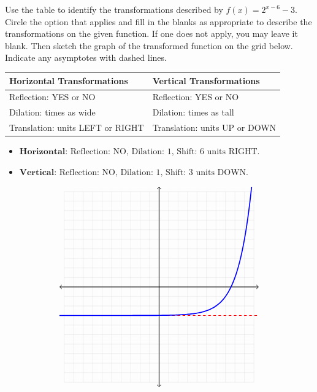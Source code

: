 \documentclass[addpoints]{exam}
\begin{document}
\begin{questions}
\begin{center}
\end{center}
\newpage

\question[5] Use the table to identify the transformations described by \(\displaystyle{ f(x) = 2^{x - 6} - 3 }\). Circle the option that applies and fill in the blanks as appropriate to describe the transformations on the given function. If one does not apply, you may leave it blank. Then sketch the graph of the transformed function on the grid below. Indicate any asymptotes with dashed lines.\\
\begin{table}[h]
    \renewcommand{\arraystretch}{3} 
    \centering
    \begin{tabular}{|l|l|}
        \hline
        \textbf{Horizontal Transformations} & \textbf{Vertical Transformations} \\ \hline
        Reflection: YES or NO & Reflection: YES or NO \\ \hline
        Dilation: \underline{\hspace{2cm}} times as wide & Dilation: \underline{\hspace{2cm}} times as tall \\ \hline
        Translation: \underline{\hspace{2cm}} units LEFT or RIGHT & Translation: \underline{\hspace{2cm}} units UP or DOWN \\ \hline
    \end{tabular}
\end{table}
\begin{solution}
\begin{itemize}
\item
 \(\textbf{Horizontal: } \text{Reflection: NO, Dilation: 1, Shift: 6 units RIGHT.}\) 

\item
 \(\textbf{Vertical: } \text{Reflection: NO, Dilation: 1, Shift: 3 units DOWN.}\) 

\end{itemize}


 \[\begin{tikzpicture}[scale=0.39] \draw[step=1cm, gray!40, very thin] (-10,-10) grid (10,10); \draw[thick, <->] (-10.5,0) -- (10.5,0); \draw[thick, <->] (0,-10.5) -- (0,10.5); \clip (-10.5,-10.5) rectangle (10.5,10.5);\draw[dashed, red, thick] (-10.5, -3) -- (10.5, -3);\draw[blue, very thick, samples=100, domain=-10.5000000000000:10.5000000000000, smooth] plot (\x, {pow(2, \x - (6)) + (-3)});\end{tikzpicture}\]
\end{solution}


\end{questions}
\end{document}
